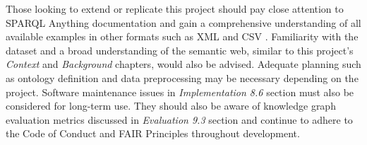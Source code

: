 Those looking to extend or replicate this project should pay close attention to SPARQL Anything \cite{sparqlanythinggithub} documentation and gain a comprehensive understanding of all available examples in other formats such as XML and CSV \cite{rattaknowledge}. Familiarity with the dataset and a broad understanding of the semantic web, similar to this project's \textit{Context} and \textit{Background} chapters, would also be advised. Adequate planning such as ontology definition and data preprocessing may be necessary depending on the project. Software maintenance issues in \textit{Implementation 8.6} section must also be considered for long-term use. They should also be aware of knowledge graph evaluation metrics discussed in \textit{Evaluation 9.3} section and continue to adhere to the Code of Conduct \cite{bcs} and FAIR Principles \cite{fairprinciples} throughout development. 
